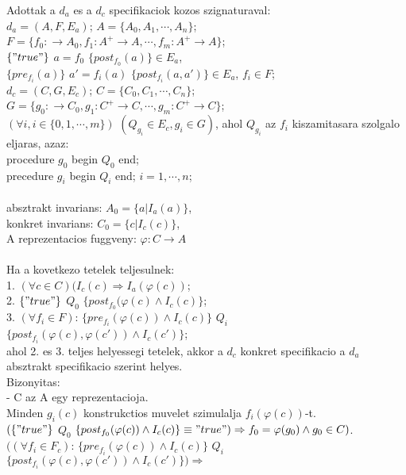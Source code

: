 \documentclass[a4paper,10pt]{article}
\begin{document}
Adottak a $d_a$ es a $d_c$ specifikaciok kozos szignaturaval:\\
$d_a=(A,F,E_a)$; $A=\lbrace A_0, A_1, \cdots, A_n\rbrace$; $F=\lbrace f_0:\to A_0, f_1:A^+ \to A, \cdots, f_m : A^+ \to A\rbrace$;\\
$\lbrace"true"\rbrace$ $a = f_0$ $\lbrace post_{f_0}(a)\rbrace \in E_a$,\\
$\lbrace pre_{f_i}(a)\rbrace$ $a' = f_i(a)$ $\lbrace post_{f_i}(a,a')\rbrace \in E_a$, $f_i \in F$;\\
$d_c=(C,G,E_c)$; $C=\lbrace C_0, C_1, \cdots, C_n\rbrace$; $G=\lbrace g_0:\to C_0, g_1: C^+\to C, \cdots, g_m: C^+ \to C\rbrace$;\\
$(\forall i, i\in \lbrace 0,1,\cdots,m\rbrace)$ $(Q_{g_i}\in E_c, g_i\in G)$, ahol $Q_{g_i}$ az $f_i$ kiszamitasara szolgalo eljaras, azaz:\\
procedure $g_0$ begin $Q_0$ end;\\
precedure $g_i$ begin $Q_i$ end; $i=1,\cdots, n$;\\\\
absztrakt invarians: $A_0=\lbrace a\vert I_a(a)\rbrace$,\\
konkret invarians: $C_0=\lbrace c\vert I_c(c)\rbrace$,\\
A reprezentacios fuggveny: $\varphi:C\to A$\\\\
Ha a kovetkezo tetelek teljesulnek:\\
1. $(\forall c \in C)(I_c(c) \Rightarrow I_a(\varphi(c))$;\\
2. $\lbrace"true"\rbrace$ $Q_0$ $\lbrace post_{f_0}(\varphi(c) \wedge I_c(c)\rbrace$;\\
3. $(\forall f_i \in F)$: $\lbrace pre_{f_i}(\varphi(c))\wedge I_c(c)\rbrace$ $Q_i$ $\lbrace post_{f_i}(\varphi(c), \varphi(c')) \wedge I_c(c')\rbrace$;\\
ahol 2. es 3. teljes  helyessegi tetelek, akkor a $d_c$ konkret specifikacio a $d_a$ absztrakt specifikacio szerint helyes.\\
Bizonyitas:\\
- C az A egy reprezentacioja.\\
Minden $g_i(c)$ konstrukctios muvelet szimulalja $f_i(\varphi(c))$-t.\\
$(\lbrace"true"\rbrace$ $Q_0$ $\lbrace post_{f_0}(\varphi(c)) \wedge I_c(c)\rbrace \equiv "true") \Rightarrow f_0 = \varphi(g_0) \wedge g_0 \in C)$.\\
$((\forall f_i\in F_c)$: $\lbrace pre_{f_i}(\varphi(c)) \wedge I_c(c)\rbrace$ $Q_i$ $\lbrace post_{f_i}(\varphi(c), \varphi(c')) \wedge I_c(c')\rbrace) \Rightarrow$\\
\end{document}

